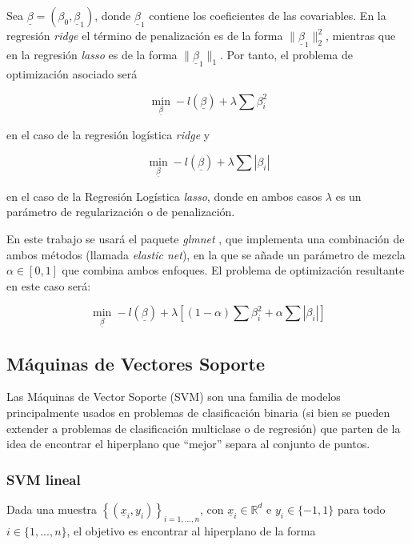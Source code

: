 \documentclass[12pt,a4paper,]{book}
\numberwithin{dummy}{section}
\theoremstyle{ocrenumbox}
\theoremstyle{blacknumex}
\theoremstyle{blacknumbox}
\theoremstyle{ocrenum}
\theoremstyle{ocrenum}
\begin{document}
Sea \(\underline \beta = \left( \beta_0, \underline \beta_1 \right)\),
donde \(\underline \beta_1\) contiene los coeficientes de las
covariables. En la regresión \emph{ridge} el término de penalización es
de la forma \(\| \underline \beta_1 \|^2_2\), mientras que en la
regresión \emph{lasso} es de la forma \(\| \underline \beta_1 \|_1\).
Por tanto, el problema de optimización asociado será

\[\min_{\underline \beta} -l(\underline \beta)  + \lambda \sum \beta_i^2 \]

en el caso de la regresión logística \emph{ridge} y

\[\min_{\underline \beta} -l(\underline \beta)  + \lambda \sum |\beta_i|\]

en el caso de la Regresión Logística \emph{lasso}, donde en ambos casos
\(\lambda\) es un parámetro de regularización o de penalización.

En este trabajo se usará el paquete \emph{glmnet} \citep{glmnetpackage},
que implementa una combinación de ambos métodos (llamada \emph{elastic
net}), en la que se añade un parámetro de mezcla
\(\alpha \in \left[0,1\right]\) que combina ambos enfoques. El problema
de optimización resultante en este caso será:

\[\min_{\underline \beta} -l(\underline \beta)  + \lambda \left[(1-\alpha)\sum \beta_i^2 + \alpha \sum |\beta_i| \right]\]

\hypertarget{muxe1quinas-de-vectores-soporte}{%
\subsection{Máquinas de Vectores
Soporte}\label{muxe1quinas-de-vectores-soporte}}

Las Máquinas de Vector Soporte (SVM) son una familia de modelos
principalmente usados en problemas de clasificación binaria (si bien se
pueden extender a problemas de clasificación multiclase o de regresión)
que parten de la idea de encontrar el hiperplano que ``mejor'' separa al
conjunto de puntos.

\hypertarget{svm-lineal}{%
\subsubsection{SVM lineal}\label{svm-lineal}}

Dada una muestra \(\left\{(\underline x_i,y_i) \right\}_{i=1,...,n}\),
con \(\underline x_i \in \mathbb{R}^d\) e \(y_i \in \{-1,1\}\) para todo
\(i \in \{1,...,n\}\), el objetivo es encontrar al hiperplano de la
forma
\end{document}
